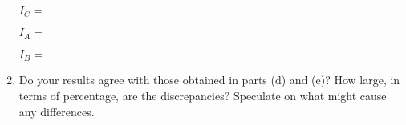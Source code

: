 \begin{enumerate}[labparts]
\hspace{0.5in}$I_C =$

\hspace{0.5in}$I_A =$

\hspace{0.5in}$I_B =$

\bigskip
\item Do your results agree with those obtained in parts (d) and (e)? How large, in terms of percentage, are the discrepancies? Speculate on what might cause any differences. 

\answerspace{15mm}
\end{enumerate}

